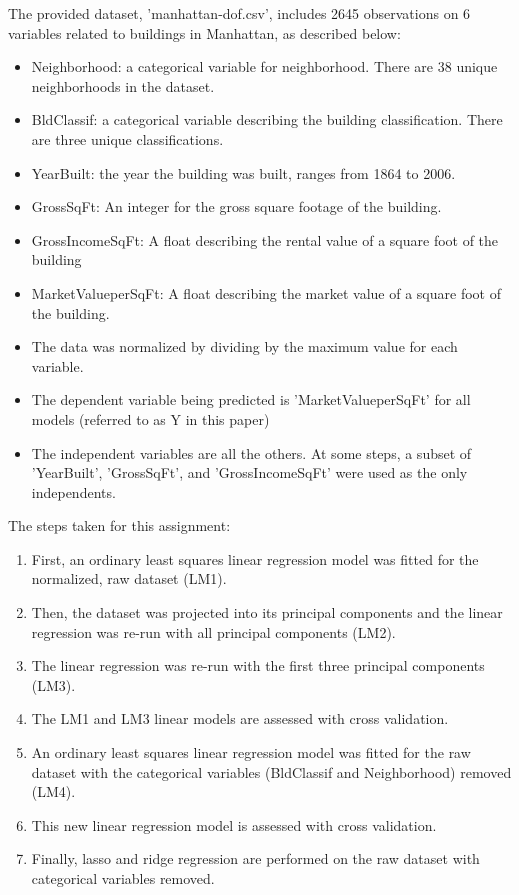 \documentclass[10pt,twocolumn]{article}
\begin{document}
The provided dataset, 'manhattan-dof.csv',
includes 2645 observations on 6 variables related to buildings in Manhattan, as described
below:
\begin{itemize}
\item Neighborhood: a categorical variable for neighborhood. There are 38 unique neighborhoods
in the dataset.
\item BldClassif: a categorical variable describing the building classification.
There are three unique classifications.
\item YearBuilt: the year the building was built, ranges from 1864 to 2006.
\item GrossSqFt: An integer for the gross square footage of the building.
\item GrossIncomeSqFt: A float describing the rental value of a square foot of the building
\item MarketValueperSqFt: A float describing the market value of a square foot of the building.
\item The data was normalized by dividing by the maximum value for each variable.
\item The dependent variable being predicted is 'MarketValueperSqFt' for all models (referred
to as Y in this paper)
\item The independent variables are all the others. At some steps, a subset of 'YearBuilt',
'GrossSqFt', and 'GrossIncomeSqFt' were used as the only independents.
\end{itemize}
The steps taken for this assignment:

\begin{enumerate}
\item First, an ordinary least squares linear regression model was fitted for
the normalized, raw dataset (LM1).
\item Then, the dataset was projected into its principal components and the linear
regression was re-run with all principal components (LM2).
\item The linear regression was re-run with the first three principal components (LM3).
\item The LM1 and LM3 linear models are assessed with cross validation.
\item An ordinary least squares linear regression model was fitted for the
raw dataset with the categorical variables (BldClassif and Neighborhood) removed (LM4).
\item This new linear regression model is assessed with cross validation.
\item Finally, lasso and ridge regression are performed on the raw dataset
with categorical variables removed.
\end{enumerate}
\end{document}
